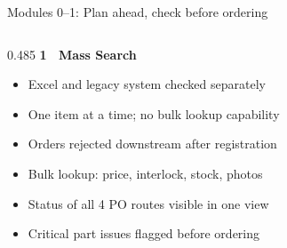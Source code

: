 \begin{frame}{Modules 0–1: Plan ahead, check before ordering}
\begin{columns}[T]
        \begin{column}{0.485\textwidth}
            {\fontsize{9.5}{12}\bfseries\selectfont\color{primary}1 \textbullet\ Mass Search}\par
            \vspace{0.2cm}
            
            \begin{beforebox}
                {\fontsize{7.8}{10.5}\selectfont\color{darkslate}
                \begin{itemize}\setlength{\itemsep}{2pt}\setlength{\leftmargin}{10pt}
                    \item[\textcolor{problemtext}{\textbullet}] Excel and legacy system checked separately
                    \item[\textcolor{problemtext}{\textbullet}] One item at a time; no bulk lookup capability
                    \item[\textcolor{problemtext}{\textbullet}] Orders rejected downstream after registration
                \end{itemize}
                }
            \end{beforebox}
            
            \vspace{0.15cm}
            
            \begin{afterbox}
                {\fontsize{7.8}{10.5}\selectfont\color{darkslate}
                \begin{itemize}\setlength{\itemsep}{2pt}\setlength{\leftmargin}{10pt}
                    \item[\textcolor{primary}{\textbullet}] Bulk lookup: price, interlock, stock, photos
                    \item[\textcolor{primary}{\textbullet}] Status of all 4 PO routes visible in one view
                    \item[\textcolor{primary}{\textbullet}] Critical part issues flagged before ordering
                \end{itemize}
                }
            \end{afterbox}
        \end{column}
    \end{columns}
\end{frame}
